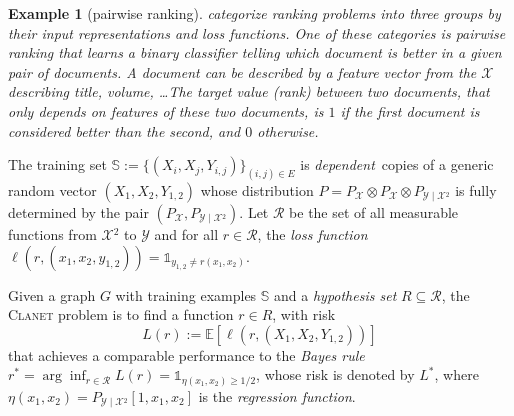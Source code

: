 \documentclass[letterpaper]{article} %
\newtheorem{example}{Example}
\newcommand{\E}{\mathbb{E}}
\newcommand{\indicator}{\mathds 1}
\newcommand{\xspace}{\mathcal{X}}
\newcommand{\yspace}{\mathcal{Y}}
\newcommand{\bayeserror}{L^*}
\newcommand{\distribution}{P}
\newcommand{\risk}{L}
\newcommand{\pair}[1]{(#1)}
\newcommand{\problemabbr}{\textnormal{C}\textsc{lanet}}
\newcommand{\trainingset}{\mathbb{S}}
\begin{document}
\begin{example}[pairwise ranking]
\cite{liu2009learning} categorize ranking problems into three groups by their input representations and loss functions. One of these categories is \emph{pairwise ranking} that learns a binary classifier telling which document is better in a given pair of documents. A document can be described by a feature vector from the $\xspace$ describing title, volume, \ldots The target value (rank) between two documents, that only depends on features of these two documents, is $1$ if the first document is considered better than the second, and $0$ otherwise. 
\end{example}

The training set $\trainingset:=\{(X_i,X_j,Y_{i,j})\}_{\pair{i,j}\in E}$ is \emph{dependent}\ copies of a generic random vector $(X_1, X_2, Y_{1,2})$ whose distribution $\distribution{}=P_\xspace\otimes P_\xspace\otimes P_{\yspace{}\mid\xspace{}^2}$ is fully determined by the pair $(P_\xspace{}, P_{\yspace{}\mid\xspace{}^2})$. 
Let $\mathcal{R}$ be the set of all measurable functions from $\xspace{}^2$ to $\yspace{}$ and for all $r\in\mathcal{R}$, the \emph{loss function} $\ell(r,(x_1,x_2,y_{1,2}))=\indicator_{y_{1,2}\neq r(x_1,x_2)}$. 

Given a graph $G$ with training examples $\trainingset$ and a \emph{hypothesis set}  $R\subseteq\mathcal{R}$, the \problemabbr{} problem is to find a function $r\in R$, with risk
\begin{equation}
    \label{eq:graph_reconstruction_risk}
    \risk(r) := \E[\ell(r, (X_1,X_2,Y_{1,2}))]
\end{equation}
that achieves a comparable performance to the \emph{Bayes rule} $r^*=\arg\inf_{r\in\mathcal{R}}\risk(r) = \indicator_{\eta(x_1,x_2)\ge 1/2}$, whose risk is denoted by $\bayeserror{}$, where $\eta(x_1,x_2)=P_{\yspace{}\mid\xspace{}^2}[1,x_1,x_2]$ is the \emph{regression function}. 
\end{document}
